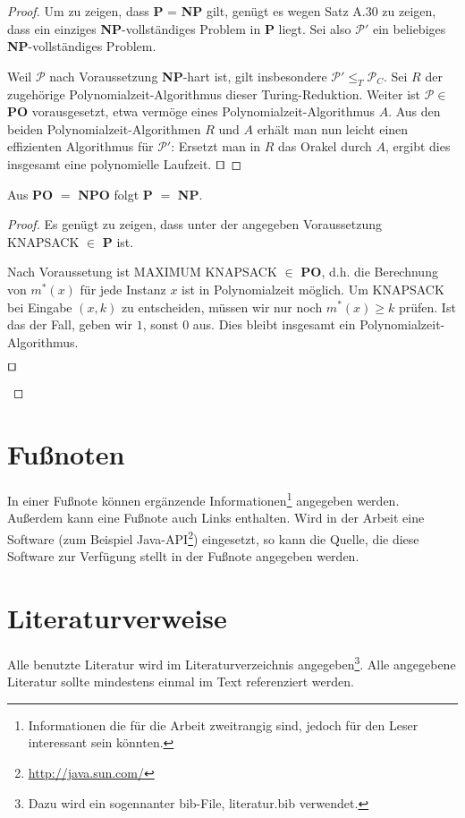 \begin{proof} Um zu zeigen, dass \textbf{P} = \textbf{NP} gilt, genügt es
wegen Satz A.30 zu zeigen, dass ein einziges \textbf{NP}-vollständiges
Problem in \textbf{P} liegt. Sei also $\mathcal{P}'$ ein beliebiges \textbf{NP}-vollständiges Problem.

Weil $\mathcal{P}$ nach Voraussetzung \textbf{NP}-hart ist, gilt insbesondere
$\mathcal{P}' \leq_T \mathcal{P}_C$. Sei $R$ der zugehörige
Polynomialzeit-Algorithmus dieser Turing-Reduktion.
Weiter ist $\mathcal{P} \in$ \textbf{PO} vorausgesetzt, etwa vermöge eines
Polynomialzeit-Algorithmus $A$. Aus den beiden
Polynomialzeit-Algorithmen $R$ und $A$ erhält man nun
leicht einen effizienten Algorithmus für $\mathcal{P}'$: Ersetzt man
in $R$ das Orakel durch $A$, ergibt dies insgesamt eine polynomielle
Laufzeit. 
$\qed$
\end{proof}

\begin{lemma} Aus \textbf{PO} $=$ \textbf{NPO} folgt \textbf{P} $=$ \textbf{NP}.
\end{lemma}

\begin{proof} Es genügt zu zeigen, dass unter der angegeben
Voraussetzung KNAPSACK $\in$ \textbf{P} ist.

Nach Voraussetung ist MAXIMUM KNAPSACK $\in$ \textbf{PO},
d.h. die Berechnung von $m^*(x)$ für jede Instanz $x$ ist
in Polynomialzeit möglich. Um KNAPSACK bei Eingabe
$(x,k)$ zu entscheiden, müssen wir nur noch $m^*(x) \geq k$
prüfen. Ist das der Fall, geben wir $1$, sonst $0$ aus. Dies
bleibt insgesamt ein Polynomialzeit-Algorithmus. 
\begin{flushright}
$\qed$
\end{flushright}
\end{proof}

\section{Fußnoten}

In einer Fußnote können ergänzende Informationen\footnote{Informationen die für die Arbeit zweitrangig sind, jedoch für den Leser interessant sein könnten.} angegeben werden. Außerdem kann eine Fußnote auch Links enthalten. Wird in der Arbeit eine Software (zum Beispiel Java-API\footnote{\url{http://java.sun.com/}}) eingesetzt, so kann die Quelle, die diese Software zur Verfügung stellt in der Fußnote angegeben werden.

\section{Literaturverweise}
Alle benutzte Literatur wird im Literaturverzeichnis angegeben\footnote{Dazu wird ein sogennanter bib-File, literatur.bib verwendet.}. Alle angegebene Literatur sollte mindestens einmal im Text referenziert werden\cite{Coulouris:02}.